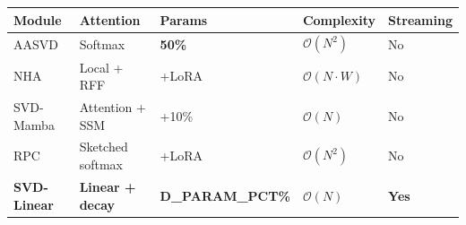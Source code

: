 \begin{table}[H]
\centering
\small
\begin{tabular}{lllll}
\toprule
\textbf{Module} & \textbf{Attention} & \textbf{Params} & \textbf{Complexity} & \textbf{Streaming} \\
\midrule
AASVD & Softmax & \textbf{ 50\%} & $\mathcal{O}(N^2)$ & No \\
NHA & Local + RFF & +LoRA & $\mathcal{O}(N \cdot W)$ & No \\
SVD-Mamba & Attention + SSM & +10\% & $\mathcal{O}(N)$ & No \\
RPC & Sketched softmax & +LoRA & $\mathcal{O}(N^2)$ & No \\
\textbf{SVD-Linear} & \textbf{Linear + decay} & \textbf{ {{D\_PARAM\_PCT}}\%} & \textbf{$\mathcal{O}(N)$} & \textbf{Yes} \\
\bottomrule
\end{tabular}
\end{table}


